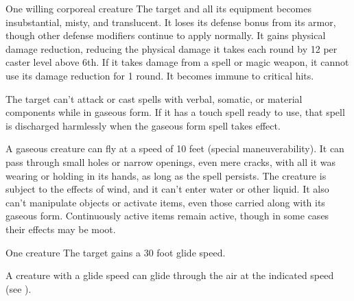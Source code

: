 \begin{spellheader}
    \spellrng{\rngtouch}
    \spelldur{\durshort \dismissable}
\end{spellheader}
\begin{spelleffects}
    \begin{spelltarget}{One willing corporeal creature}
        \spelleffect The target and all its equipment becomes insubstantial, misty, and translucent. It loses its defense bonus from its armor, though other defense modifiers continue to apply normally. It gains physical damage reduction, reducing the physical damage it takes each round by 12  per caster level above 6th. If it takes damage from a spell or magic weapon, it cannot use its damage reduction for 1 round. It becomes immune to critical hits.

        The target can't attack or cast spells with verbal, somatic, or material components while in gaseous form. If it has a touch spell ready to use, that spell is discharged harmlessly when the gaseous form spell takes effect.
        \par A gaseous creature can fly at a speed of 10 feet (special maneuverability). It can pass through small holes or narrow openings, even mere cracks, with all it was wearing or holding in its hands, as long as the spell persists. The creature is subject to the effects of wind, and it can't enter water or other liquid. It also can't manipulate objects or activate items, even those carried along with its gaseous form. Continuously active items remain active, though in some cases their effects may be moot.
    \end{spelltarget}
\end{spelleffects}
\begin{spellfooter}
    
\end{spellfooter}

\begin{spellheader}
    \spellrng{\rngmed}
    \spelldur{\durlong}
\end{spellheader}
\begin{spelleffects}
    \begin{spelltarget}{One creature}
        \spelleffect The target gains a 30 foot glide speed.
    \end{spelltarget}
\end{spelleffects}
\begin{spellfooter}
    \spellnotes A creature with a glide speed can glide through the air at the indicated speed (see ).
\end{spellfooter}

